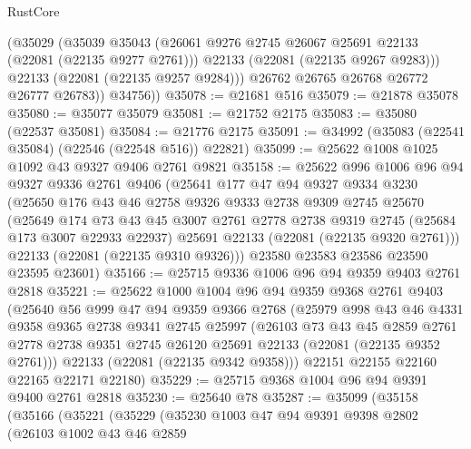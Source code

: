 \begin{lexlean}{RustCore}
\begin{coremodule}
            (@35029
              (@35039
                @35043
                (@26061 @9276 @2745 @26067 @25691 @22133 (@22081 (@22135 @9277 @2761)))
                @22133
                (@22081 (@22135 @9267 @9283)))
              @22133
              (@22081 (@22135 @9257 @9284)))
            @26762
            @26765
            @26768
            @26772
            @26777
            @26783))
        @34756))
@35078 := @21681 @516
@35079 := @21878 @35078
@35080 := @35077 @35079
@35081 := @21752 @2175
@35083 := @35080 (@22537 @35081)
@35084 := @21776 @2175
@35091 := @34992 (@35083 (@22541 @35084) (@22546 (@22548 @516)) @22821)
@35099 := @25622 @1008 @1025 @1092 @43 @9327 @9406 @2761 @9821
@35158 := @25622
    @996
    @1006
    @96
    @94
    @9327
    @9336
    @2761
    @9406
    (@25641
      @177
      @47
      @94
      @9327
      @9334
      @3230
      (@25650
        @176
        @43
        @46
        @2758
        @9326
        @9333
        @2738
        @9309
        @2745
        @25670
        (@25649
          @174
          @73
          @43
          @45
          @3007
          @2761
          @2778
          @2738
          @9319
          @2745
          (@25684 @173 @3007 @22933 @22937)
          @25691
          @22133
          (@22081 (@22135 @9320 @2761)))
        @22133
        (@22081 (@22135 @9310 @9326)))
      @23580
      @23583
      @23586
      @23590
      @23595
      @23601)
@35166 := @25715 @9336 @1006 @96 @94 @9359 @9403 @2761 @2818
@35221 := @25622
    @1000
    @1004
    @96
    @94
    @9359
    @9368
    @2761
    @9403
    (@25640
      @56
      @999
      @47
      @94
      @9359
      @9366
      @2768
      (@25979
        @998
        @43
        @46
        @4331
        @9358
        @9365
        @2738
        @9341
        @2745
        @25997
        (@26103
          @73
          @43
          @45
          @2859
          @2761
          @2778
          @2738
          @9351
          @2745
          @26120
          @25691
          @22133
          (@22081 (@22135 @9352 @2761)))
        @22133
        (@22081 (@22135 @9342 @9358)))
      @22151
      @22155
      @22160
      @22165
      @22171
      @22180)
@35229 := @25715 @9368 @1004 @96 @94 @9391 @9400 @2761 @2818
@35230 := @25640 @78
@35287 := @35099
    (@35158
      (@35166
        (@35221
          (@35229
            (@35230
              @1003
              @47
              @94
              @9391
              @9398
              @2802
              (@26103
                @1002
                @43
                @46
                @2859

\end{coremodule}
\end{lexlean}
